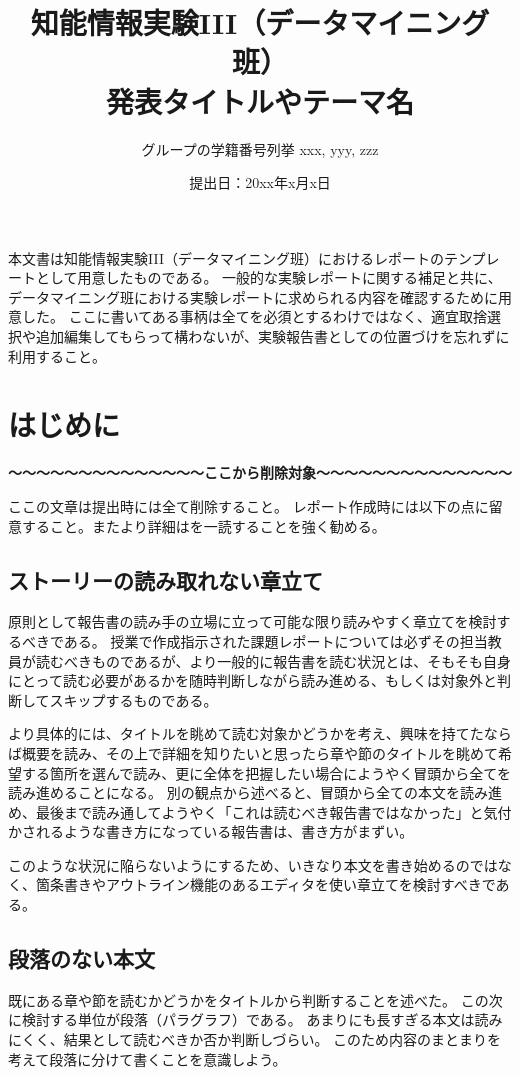 \documentclass[a4paper, 11pt, titlepage]{jsarticle}
\title{知能情報実験III（データマイニング班）\\発表タイトルやテーマ名}
\author{グループの学籍番号列挙 xxx, yyy, zzz}
\date{提出日：20xx年x月x日}
\begin{document}
\maketitle
\tableofcontents
\clearpage

本文書は知能情報実験III（データマイニング班）におけるレポートのテンプレートとして用意したものである。
一般的な実験レポートに関する補足と共に、データマイニング班における実験レポートに求められる内容を確認するために用意した。
ここに書いてある事柄は全てを必須とするわけではなく、適宜取捨選択や追加編集してもらって構わないが、実験報告書としての位置づけを忘れずに利用すること。

\section{はじめに}

{\bf 〜〜〜〜〜〜〜〜〜〜〜〜〜〜ここから削除対象〜〜〜〜〜〜〜〜〜〜〜〜〜〜}

ここの文章は提出時には全て削除すること。
レポート作成時には以下の点に留意すること。またより詳細は\cite{kanazawa}を一読することを強く勧める。

\subsection{ストーリーの読み取れない章立て}
原則として報告書の読み手の立場に立って可能な限り読みやすく章立てを検討するべきである。
授業で作成指示された課題レポートについては必ずその担当教員が読むべきものであるが、より一般的に報告書を読む状況とは、そもそも自身にとって読む必要があるかを随時判断しながら読み進める、もしくは対象外と判断してスキップするものである。

より具体的には、タイトルを眺めて読む対象かどうかを考え、興味を持てたならば概要を読み、その上で詳細を知りたいと思ったら章や節のタイトルを眺めて希望する箇所を選んで読み、更に全体を把握したい場合にようやく冒頭から全てを読み進めることになる。
別の観点から述べると、冒頭から全ての本文を読み進め、最後まで読み通してようやく「これは読むべき報告書ではなかった」と気付かされるような書き方になっている報告書は、書き方がまずい。

このような状況に陥らないようにするため、いきなり本文を書き始めるのではなく、箇条書きやアウトライン機能のあるエディタを使い章立てを検討すべきである。

\subsection{段落のない本文}
既にある章や節を読むかどうかをタイトルから判断することを述べた。
この次に検討する単位が段落（パラグラフ）である。
あまりにも長すぎる本文は読みにくく、結果として読むべきか否か判断しづらい。
このため内容のまとまりを考えて段落に分けて書くことを意識しよう。
\end{document}
